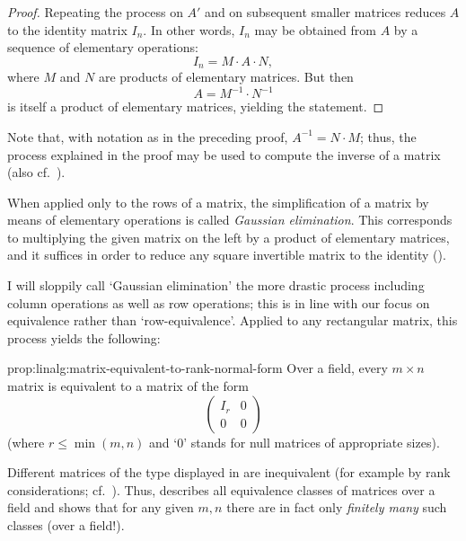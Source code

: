 \begin{proof}
  Repeating the process on $A'$ and on subsequent smaller matrices
  reduces $A$ to the identity matrix $I_n$. In other words, $I_n$ may
  be obtained from $A$ by a sequence of elementary operations:
  \[
    I_n = M \cdot A \cdot N,
  \]
  where $M$ and $N$ are products of elementary matrices. But then
  \[
    A = M^{-1} \cdot N^{-1}
  \]
  is itself a product of elementary matrices, yielding the statement.
\end{proof}

Note that, with notation as in the preceding proof,
$A^{-1} = N \cdot M$; thus, the process explained in the proof may be
used to compute the inverse of a matrix (also cf.\
).

When applied only to the rows of a matrix, the simplification of a
matrix by means of elementary operations is called \emph{Gaussian
  elimination}. This corresponds to multiplying the given matrix on
the left by a product of elementary matrices, and it suffices in order
to reduce any square invertible matrix to the identity
().

I will sloppily call `Gaussian elimination' the more drastic process
including column operations as well as row operations; this is in line
with our focus on equivalence rather than `row-equivalence'. Applied
to any rectangular matrix, this process yields the following:
\begin{prop}{}{prop:linalg:matrix-equivalent-to-rank-normal-form}
  Over a field, every $m \times n$ matrix is equivalent to a matrix of
  the form
  \[
    \left(
      \begin{array}{c|c}
        I_r & 0 \\
        \hline
        0 & 0
      \end{array}
    \right)
  \]
  (where $r \leq \min(m,n)$ and `0' stands for null matrices of
  appropriate sizes).
\end{prop}
Different matrices of the type displayed in  are
inequivalent (for example by rank considerations; cf.\
\Cref{subsec:linalg:rank-and-nullity}). Thus, 
describes all equivalence classes of matrices over a field and shows
that for any given $m, n$ there are in fact only \emph{finitely many}
such classes (over a field!).

